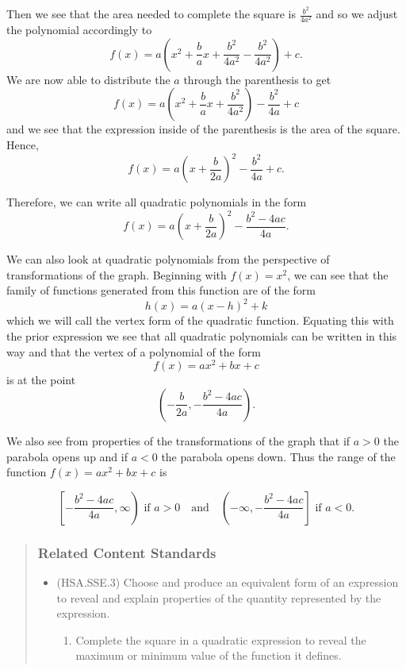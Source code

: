 \documentclass[
]{book}
\providecommand{\tightlist}{%
  \setlength{\itemsep}{0pt}\setlength{\parskip}{0pt}}
\theoremstyle{definition}
\theoremstyle{definition}
\theoremstyle{definition}
\theoremstyle{remark}
\begin{document}
Then we see that the area needed to complete the square is
\(\frac{b^2}{4a^2}\) and so we adjust the polynomial accordingly to
\[f(x) = a \left( x^2 +\frac{b}{a}x + \frac{b^2}{4a^2} - \frac{b^2}{4a^2} \right) + c.\] We are now able to distribute the \(a\) through the parenthesis to get
\[f(x) = a \left( x^2 +\frac{b}{a}x + \frac{b^2}{4a^2}  \right)- \frac{b^2}{4a} + c\] and we see that the expression inside of the parenthesis is the area of the square. Hence,
\[f(x) = a \left(x+\frac{b}{2a}  \right)^2- \frac{b^2}{4a} + c.\]

Therefore, we can write all quadratic polynomials in the form
\[f(x) = a \left(x+\frac{b}{2a}  \right)^2- \frac{b^2-4ac}{4a}.\]

We can also look at quadratic polynomials from the perspective of transformations of the graph. Beginning with \(f(x)=x^2\), we can see that the family of functions generated from this function are of the form \[h(x)= a (x-h)^2 + k\] which we will call the vertex form of the quadratic function. Equating this with the prior expression we see that all quadratic polynomials can be written in this way and that the vertex of a polynomial of the form \[f(x)=ax^2+bx+c\] is at the point \[\left(-\frac{b}{2a}, - \frac{b^2-4ac}{4a}\right).\]

We also see from properties of the transformations of the graph that if \(a>0\) the parabola opens up and if \(a<0\) the parabola opens down. Thus the range of the function \(f(x)=ax^2+bx+c\) is

\[\left[-\frac{b^2-4ac}{4a}, \infty \right) \mbox{ if } a>0 \quad \mbox{and} \quad \left(-\infty, -\frac{b^2-4ac}{4a}\right] \mbox{ if } a<0.\]

\begin{quote}
\hypertarget{related-content-standards-48}{%
\subsubsection*{Related Content Standards}\label{related-content-standards-48}}

\begin{itemize}
\tightlist
\item
  (HSA.SSE.3) Choose and produce an equivalent form of an expression to reveal and explain properties of the quantity represented by the expression.

  \begin{enumerate}
  \def\labelenumi{\alph{enumi}.}
  \setcounter{enumi}{1}
  \tightlist
  \item
    Complete the square in a quadratic expression to reveal the maximum or minimum value of the function it defines.
  \end{enumerate}
\end{itemize}
\end{quote}
\end{document}

